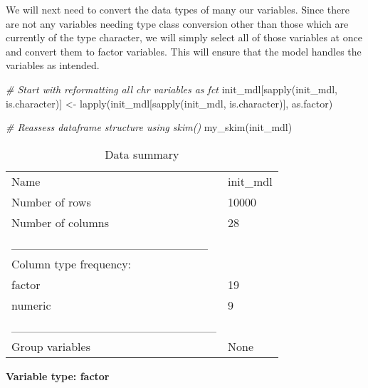 \documentclass[
]{article}
\newenvironment{Shaded}{\begin{snugshade}}{\end{snugshade}}
\newcommand{\CommentTok}[1]{\textcolor[rgb]{0.56,0.35,0.01}{\textit{#1}}}
\newcommand{\FunctionTok}[1]{\textcolor[rgb]{0.00,0.00,0.00}{#1}}
\newcommand{\NormalTok}[1]{#1}
\newcommand{\OtherTok}[1]{\textcolor[rgb]{0.56,0.35,0.01}{#1}}
\begin{document}
We will next need to convert the data types of many our variables. Since
there are not any variables needing type class conversion other than
those which are currently of the type character, we will simply select
all of those variables at once and convert them to factor variables.
This will ensure that the model handles the variables as intended.

\begin{Shaded}
\begin{Highlighting}[]
\CommentTok{\# Start with reformatting all chr variables as fct}
\NormalTok{init\_mdl[}\FunctionTok{sapply}\NormalTok{(init\_mdl, }
\NormalTok{                is.character)] }\OtherTok{\textless{}{-}} \FunctionTok{lapply}\NormalTok{(init\_mdl[}\FunctionTok{sapply}\NormalTok{(init\_mdl, }
\NormalTok{                                                         is.character)], }
\NormalTok{                                         as.factor)}

\CommentTok{\# Reassess dataframe structure using skim()}
\FunctionTok{my\_skim}\NormalTok{(init\_mdl)}
\end{Highlighting}
\end{Shaded}

\begin{longtable}[]{@{}ll@{}}
\caption{Data summary}\tabularnewline
\toprule
\endhead
Name & init\_mdl \\
Number of rows & 10000 \\
Number of columns & 28 \\
\_\_\_\_\_\_\_\_\_\_\_\_\_\_\_\_\_\_\_\_\_\_\_ & \\
Column type frequency: & \\
factor & 19 \\
numeric & 9 \\
\_\_\_\_\_\_\_\_\_\_\_\_\_\_\_\_\_\_\_\_\_\_\_\_ & \\
Group variables & None \\
\bottomrule
\end{longtable}

\textbf{Variable type: factor}
\end{document}
